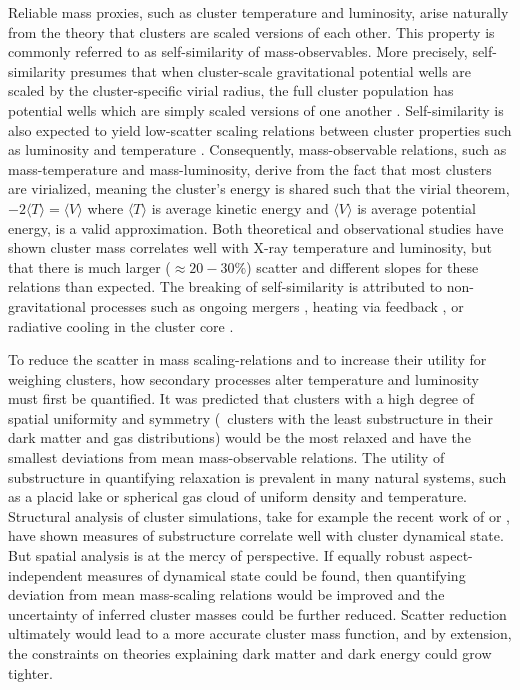 Reliable mass proxies, such as cluster temperature and luminosity,
arise naturally from the theory that clusters are scaled versions of
each other. This property is commonly referred to as self-similarity
of mass-observables. More precisely, self-similarity presumes that
when cluster-scale gravitational potential wells are scaled by the
cluster-specific virial radius, the full cluster population has
potential wells which are simply scaled versions of one another
\citep{nfw1, nfw2}. Self-similarity is also expected to yield
low-scatter scaling relations between cluster properties such as
luminosity and temperature \citep{kaiser86, kaiser91,
  1991ApJ...383...95E, nfw1, nfw2, 1998ApJ...503..569E,
  1999ApJ...525..554F}. Consequently, mass-observable relations, such
as mass-temperature and mass-luminosity, derive from the fact that
most clusters are virialized, meaning the cluster's energy is shared
such that the virial theorem, $-2 \langle T \rangle = \langle V
\rangle$ where $\langle T \rangle$ is average kinetic energy and
$\langle V \rangle$ is average potential energy, is a valid
approximation. Both theoretical \citep{1996ApJ...469..494E,
  1998ApJ...495...80B, 1999ApJ...517..627M, 2001ApJ...555..597B,
  2002MNRAS.336..409B} and observational \citep{1984PhST....7..157M,
  edge91, white97, 1998MNRAS.297L..57A, 1998ApJ...503...77M,
  1999MNRAS.305..631A, 2001A&A...368..749F} studies have shown cluster
mass correlates well with X-ray temperature and luminosity, but that
there is much larger ($\approx 20-30\%$) scatter and different slopes
for these relations than expected. The breaking of self-similarity is
attributed to non-gravitational processes such as ongoing mergers
\citep[eg][]{2002ApJ...577..579R}, heating via feedback
\citep[eg][]{1999MNRAS.308..599C, bower01}, or radiative cooling in
the cluster core \citep[eg][]{2001Natur.414..425V, voitbryan}.

To reduce the scatter in mass scaling-relations and to increase their
utility for weighing clusters, how secondary processes alter
temperature and luminosity must first be quantified. It was predicted
that clusters with a high degree of spatial uniformity and symmetry
(\eg\ clusters with the least substructure in their dark matter and
gas distributions) would be the most relaxed and have the smallest
deviations from mean mass-observable relations. The utility of
substructure in quantifying relaxation is prevalent in many natural
systems, such as a placid lake or spherical gas cloud of uniform
density and temperature. Structural analysis of cluster simulations,
take for example the recent work of \citet{2008ApJ...681..167J} or
\citet{VV08}, have shown measures of substructure correlate well with
cluster dynamical state. But spatial analysis is at the mercy of
perspective. If equally robust aspect-independent measures of
dynamical state could be found, then quantifying deviation from mean
mass-scaling relations would be improved and the uncertainty of
inferred cluster masses could be further reduced. Scatter reduction
ultimately would lead to a more accurate cluster mass function, and by
extension, the constraints on theories explaining dark matter and dark
energy could grow tighter.

